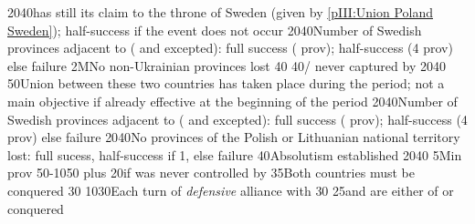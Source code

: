 %
%
{20}{40}{\POL has still its claim to the throne of Sweden (given by
  \ref{pIII:Union Poland Sweden}); half-success if the event does not occur}%
%
%
%
{20}{40}{Number of Swedish provinces adjacent to \regionBaltique (\regionSuede
  and \regionFinlande excepted): full success ( prov);
  half-success (4 prov) else failure}%
%
\EUobjective2M{No non-Ukrainian provinces lost}{}%
{}{40}{}%
%
%
{}{40}{\provinceOsterreich/ never captured by
  }%
%
%
{20}{40}{\EU@objNoRUSBaltique}%
%
%
%
{}{50}{Union between these two countries has taken place during the period;
  not a main objective if already effective at the beginning of the period}%
%
%
%
{20}{40}{Number of Swedish provinces adjacent to \regionBaltique (\regionSuede
  and \regionFinlande excepted): full success ( prov);
  half-success (4 prov) else failure}%
%
%
{20}{40}{No provinces of the Polish or Lithuanian national territory lost:
  full sucess, half-success if 1, else failure}%
%
%
{}{40}{Absolutism established}%
%
%
{20}{40}{\EU@objNoRUSBaltique}%
%
\EUobjective5M{\TUR in \payshongrie}{prov}%
{50-10}{50}{ plus 20\VPs if \villeVienne was never
  controlled by \paysmajeurTurquie}%
%
 
%
%
{}{35}{Both countries must be conquered}%
%
%
{}{30}{}%
%
%
{10}{30}{Each turn of \emph{defensive} alliance with \paysmajeurFrance}%
%
%
{}{30}{}%
%
%
{}{25}{\paysvalachie and \paysmoldavie are either \VASSAL of \TUR or
  conquered}%
%
%
%
